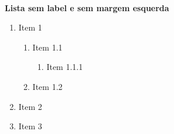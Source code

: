 \documentclass[12pt,a4paper]{article}
\begin{document}
\noindent\\

\noindent\textbf{Lista sem label e sem margem esquerda}
\begin{enumerate}[label={},leftmargin=0cm,labelindent=0.5cm]
	\item Item 1
	\begin{enumerate}[label={},leftmargin=*,labelindent=0.5cm]
		\item Item 1.1
		\begin{enumerate}[label={},leftmargin=*,labelindent=0.5cm]
			\item Item 1.1.1
		\end{enumerate}
		\item Item 1.2
	\end{enumerate}
	\item Item 2
	\item Item 3
\end{enumerate}
\end{document}
